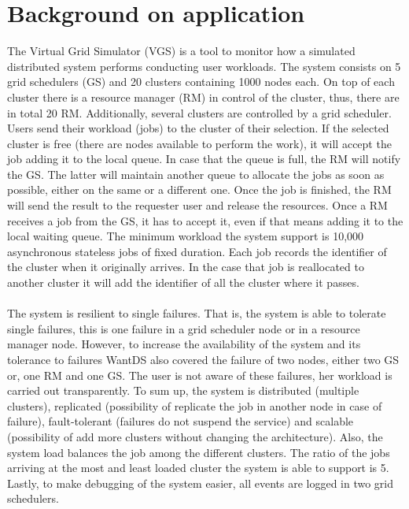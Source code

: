 \section{Background on application}
The Virtual Grid Simulator (VGS) is a tool to monitor how a simulated distributed system performs conducting user workloads. The system consists on 5 grid schedulers (GS) and 20 clusters containing 1000 nodes each. On top of each cluster there is a resource manager (RM) in control of the cluster, thus, there are in total 20 RM. Additionally, several clusters are controlled by a grid scheduler. Users send their workload (jobs) to the cluster of their selection. If the selected cluster is free (there are nodes available to perform the work), it will accept the job adding it to the local queue. In case that the queue is full, the RM will notify the GS. The latter will maintain another queue to allocate the jobs as soon as possible, either on the same or a different one. Once the job is finished, the RM will send the result to the requester user and release the resources. Once a RM receives a job from the GS, it has to accept it, even if that means adding it to the local waiting queue. The minimum workload the system support is 10,000 asynchronous stateless jobs of fixed duration. Each job records the identifier of the cluster when it originally arrives. In the case that job is reallocated to another cluster it will add the identifier of all the cluster where it passes.
\\\\
The system is resilient to single failures. That is, the system is able to tolerate single failures, this is one failure in a grid scheduler node or in a resource manager node. However, to increase the availability of the system and its tolerance to failures WantDS also covered the failure of two nodes, either two GS or, one RM and one GS. The user is not aware of these failures, her workload is carried out transparently. To sum up, the system is distributed (multiple clusters), replicated (possibility of replicate the job in another node in case of failure), fault-tolerant (failures do not suspend the service) and scalable (possibility of add more clusters without changing the architecture). Also, the system load balances the job among the different clusters. The ratio of the jobs arriving at the most and least loaded cluster the system is able to support is 5. Lastly, to make debugging of the system easier, all events are logged in two grid schedulers.
